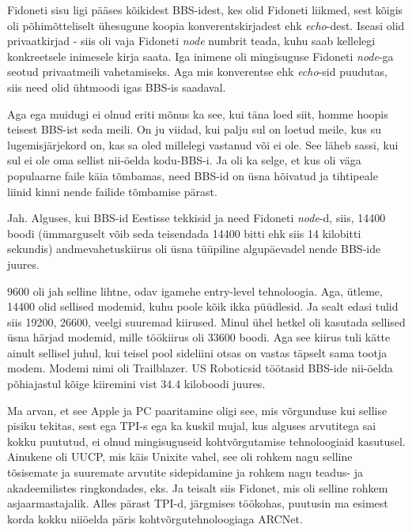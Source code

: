 Fidoneti sisu ligi pääses kõikidest BBS-idest, kes olid Fidoneti liikmed, sest 
kõigis oli põhimõtteliselt ühesugune koopia konverentskirjadest ehk \emph{echo}-dest. 
Iseasi olid privaatkirjad - siis oli  vaja Fidoneti \emph{node} numbrit teada, 
kuhu saab kellelegi konkreetsele inimesele kirja saata. Iga inimene oli  mingisuguse 
Fidoneti \emph{node}-ga seotud   privaatmeili vahetamiseks. Aga mis konverentse 
ehk \emph{echo}-sid puudutas,  siis need  olid ühtmoodi igas BBS-is  saadaval.

Aga ega muidugi ei olnud eriti mõnus ka see, kui täna loed siit, homme  hoopis 
teisest BBS-ist seda meili. On ju viidad, kui palju sul on loetud meile, kus 
su lugemisjärjekord on, kas sa oled millelegi vastanud või ei ole. See  läheb 
sassi, kui sul ei ole oma sellist nii-öelda kodu-BBS-i. Ja oli ka selge, et kus 
oli väga populaarne faile käia tõmbamas,  need BBS-id on  üsna hõivatud ja 
tihtipeale liinid kinni nende failide tõmbamise pärast. 


Jah. Alguses, kui BBS-id Eestisse tekkisid ja need Fidoneti \emph{node}-d, 
siis, 14400 boodi (ümmarguselt võib seda teisendada 14400 
bitti ehk siis 14 kilobitti sekundis) andmevahetuskiirus oli üsna tüüpiline  
algupäevadel nende BBS-ide juures.


9600 oli jah selline lihtne, odav igamehe entry-level tehnoloogia. Aga, ütleme, 14400 olid 
sellised modemid, kuhu poole kõik ikka püüdlesid. Ja sealt edasi tulid siis 
19200, 26600, veelgi suuremad kiirused. Minul ühel hetkel oli kasutada sellised 
üsna  härjad modemid, mille töökiirus oli 33600 boodi. Aga see kiirus tuli 
kätte ainult sellisel juhul, kui teisel pool sideliini otsas on vastas täpselt 
sama tootja modem. Modemi  nimi oli Trailblazer. US Roboticsid  töötasid BBS-ide 
nii-öelda  põhiajastul kõige kiiremini vist 34.4 kiloboodi juures.


Ma arvan, et see Apple ja PC paaritamine oligi see, mis  võrgunduse kui sellise 
pisiku tekitas, sest ega TPI-s ega ka kuskil mujal, kus alguses arvutitega sai kokku 
puututud, ei olnud mingisuguseid kohtvõrgutamise tehnoloogiaid 
kasutusel. Ainukene oli UUCP, mis käis Unixite vahel, see oli rohkem nagu 
selline tõsisemate ja suuremate arvutite sidepidamine  ja rohkem nagu teadus- 
ja akadeemilistes ringkondades, eks. Ja teisalt siis Fidonet, mis oli selline 
rohkem asjaarmastajalik. Alles pärast TPI-d, järgmises töökohas, puutusin ma esimest 
korda kokku niiöelda päris kohtvõrgutehnoloogiaga ARCNet.

